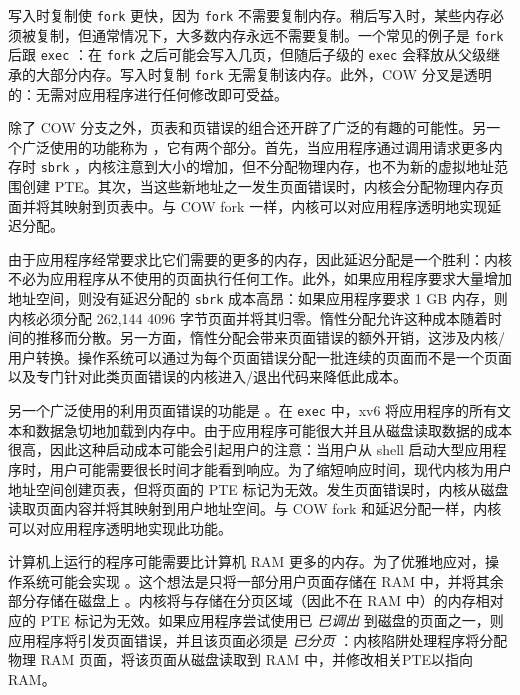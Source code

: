 \documentclass[UTF8]{article}
\begin{document}
写入时复制使    \lstinline{fork}    更快，因为    \lstinline{fork}    不需要复制内存。稍后写入时，某些内存必须被复制，但通常情况下，大多数内存永远不需要复制。一个常见的例子是
    \lstinline{fork}    后跟    \lstinline{exec}    ：在    \lstinline{fork}    之后可能会写入几页，但随后子级的    \lstinline{exec}    会释放从父级继承的大部分内存。写入时复制    \lstinline{fork}    无需复制该内存。此外，COW 分叉是透明的：无需对应用程序进行任何修改即可受益。  

除了 COW 分支之外，页表和页错误的组合还开辟了广泛的有趣的可能性。另一个广泛使用的功能称为        ，它有两个部分。首先，当应用程序通过调用请求更多内存时
    \lstinline{sbrk}    ，内核注意到大小的增加，但不分配物理内存，也不为新的虚拟地址范围创建 PTE。其次，当这些新地址之一发生页面错误时，内核会分配物理内存页面并将其映射到页表中。与 COW fork 一样，内核可以对应用程序透明地实现延迟分配。  

由于应用程序经常要求比它们需要的更多的内存，因此延迟分配是一个胜利：内核不必为应用程序从不使用的页面执行任何工作。此外，如果应用程序要求大量增加地址空间，则没有延迟分配的    \lstinline{sbrk}    成本高昂：如果应用程序要求 1 GB 内存，则内核必须分配 262,144 4096 字节页面并将其归零。惰性分配允许这种成本随着时间的推移而分散。另一方面，惰性分配会带来页面错误的额外开销，这涉及内核/用户转换。操作系统可以通过为每个页面错误分配一批连续的页面而不是一个页面以及专门针对此类页面错误的内核进入/退出代码来降低此成本。  

另一个广泛使用的利用页面错误的功能是
        。在    \lstinline{exec}    中，xv6 将应用程序的所有文本和数据急切地加载到内存中。由于应用程序可能很大并且从磁盘读取数据的成本很高，因此这种启动成本可能会引起用户的注意：当用户从 shell 启动大型应用程序时，用户可能需要很长时间才能看到响应。为了缩短响应时间，现代内核为用户地址空间创建页表，但将页面的 PTE 标记为无效。发生页面错误时，内核从磁盘读取页面内容并将其映射到用户地址空间。与 COW fork 和延迟分配一样，内核可以对应用程序透明地实现此功能。  

计算机上运行的程序可能需要比计算机 RAM 更多的内存。为了优雅地应对，操作系统可能会实现        。这个想法是只将一部分用户页面存储在 RAM 中，并将其余部分存储在磁盘上
        。内核将与存储在分页区域（因此不在 RAM 中）的内存相对应的 PTE 标记为无效。如果应用程序尝试使用已  {    \it    已调出   }  到磁盘的页面之一，则应用程序将引发页面错误，并且该页面必须是  {    \it    已分页   }  ：内核陷阱处理程序将分配物理 RAM 页面，将该页面从磁盘读取到 RAM 中，并修改相关PTE以指向RAM。  
\end{document}
